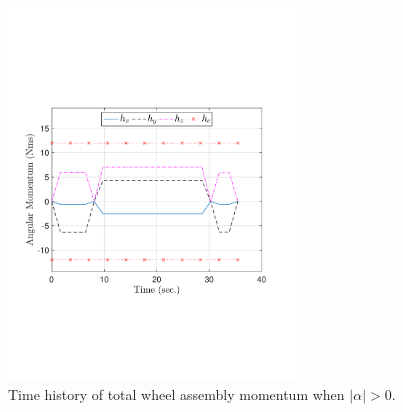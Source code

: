 \documentclass[journal ]{new-aiaa}
\begin{document}
\begin{figure}[htb!]
\centering
\begin{minipage}{.5\textwidth}
	\centering
	\includegraphics[width=3in]{total_angular_momentum.pdf}
\end{minipage}%
\caption{Time history of total wheel assembly momentum when $|\alpha|>0$.}
\label{fig:quats_phi_total0}
\end{figure}
	
\end{document}
